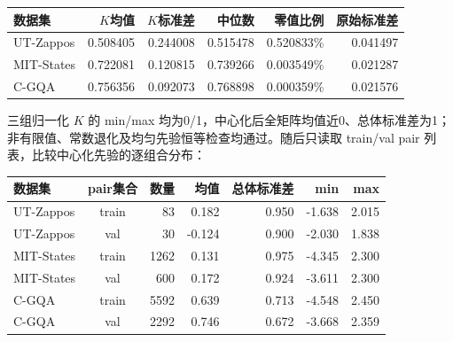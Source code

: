 \documentclass[12pt,a4paper,UTF8]{ctexart}
\newenvironment{reporttable}{\par\smallskip\begingroup\small\centering}{\par\endgroup\smallskip}
\begin{document}
\begin{reporttable}

\footnotesize

\begin{tabularx}{\linewidth}{|Y|r|r|r|r|r|}
\hline

\textbf{数据集} & \textbf{$K$均值} & \textbf{$K$标准差} & \textbf{中位数} & \textbf{零值比例} & \textbf{原始标准差} \\ \hline

UT-Zappos & 0.508405 & 0.244008 & 0.515478 & 0.520833\% & 0.041497 \\ \hline

MIT-States & 0.722081 & 0.120815 & 0.739266 & 0.003549\% & 0.021287 \\ \hline

C-GQA & 0.756356 & 0.092073 & 0.768898 & 0.000359\% & 0.021576 \\ \hline

\end{tabularx}\end{reporttable}

三组归一化 $K$ 的 min/max 均为0/1，中心化后全矩阵均值近0、总体标准差为1；非有限值、常数退化及均匀先验恒等检查均通过。随后只读取 train/val pair 列表，比较中心化先验的逐组合分布：

\begin{reporttable}

\footnotesize

\begin{tabularx}{\linewidth}{|Y|c|r|r|r|r|r|}
\hline

\textbf{数据集} & \textbf{pair集合} & \textbf{数量} & \textbf{均值} & \textbf{总体标准差} & \textbf{min} & \textbf{max} \\ \hline

UT-Zappos & train & 83 & 0.182 & 0.950 & -1.638 & 2.015 \\ \hline

UT-Zappos & val & 30 & -0.124 & 0.900 & -2.030 & 1.838 \\ \hline

MIT-States & train & 1262 & 0.131 & 0.975 & -4.345 & 2.300 \\ \hline

MIT-States & val & 600 & 0.172 & 0.924 & -3.611 & 2.300 \\ \hline

C-GQA & train & 5592 & 0.639 & 0.713 & -4.548 & 2.450 \\ \hline

C-GQA & val & 2292 & 0.746 & 0.672 & -3.668 & 2.359 \\ \hline

\end{tabularx}\end{reporttable}
\end{document}
